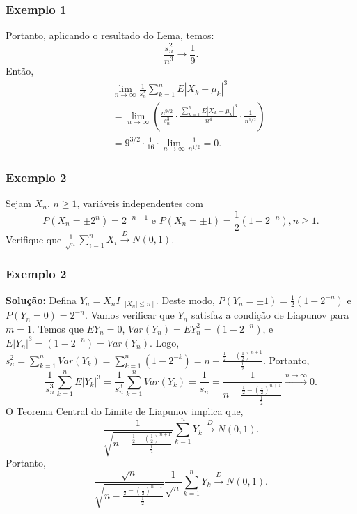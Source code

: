 \begin{frame}
\frametitle{\textbf{Exemplo 1}}
\baselineskip=13pt
\begin{block}{}

Portanto, aplicando o resultado do Lema, temos:
$$\frac{s_n^2}{n^3}\rightarrow \frac{1}{9}.$$
Então,
\begin{eqnarray}
& & \lim_{n\rightarrow\infty}\frac{1}{s_n^3}\sum_{k=1}^{n}E|X_k-\mu_k|^3\nonumber\\
& & =\lim_{n\rightarrow\infty}(\frac{n^{9/2}}{s_n^3}\cdot\frac{\sum_{k=1}^{n}E|X_k-\mu_k|^3}{n^4}\cdot\frac{1}{n^{1/2}})\nonumber\\
& & =9^{3/2}\cdot\frac{1}{16}\cdot\lim_{n\rightarrow\infty}\frac{1}{n^{1/2}}=0.\nonumber
\end{eqnarray}


\end{block}
\end{frame}

\begin{frame}
\frametitle{\textbf{Exemplo 2}}
\baselineskip=13pt
\begin{block}{}

Sejam $X_n$, $n\geq 1$, variáveis independentes com
$$P(X_n=\pm 2^n)=2^{-n-1}\mbox{ e }P(X_n=\pm 1)=\frac{1}{2}(1-2^{-n}),n\geq 1.$$
Verifique que $\frac{1}{\sqrt{n}}\sum_{i=1}^{n}X_i\xrightarrow{D}N(0,1)$.

\end{block}
\end{frame}

\begin{frame}
\frametitle{\textbf{Exemplo 2}}
\baselineskip=13pt
\begin{block}{}


{\bf Solução:} Defina $Y_n=X_nI_{[|X_n|\leq n]}$. Deste modo, $P(Y_n=\pm 1)=\frac{1}{2}(1-2^{-n})$ e $P(Y_n=0)=2^{-n}$. Vamos verificar que $Y_n$ satisfaz a condição de Liapunov para $m=1$. Temos que $EY_n=0$, $Var(Y_n)=EY_n^2=(1-2^{-n})$, e $E|Y_n|^3=(1-2^{-n})=Var(Y_n)$. Logo, $s_n^2=\sum_{k=1}^{n}Var(Y_k)=\sum_{k=1}^{n}(1-2^{-k})=n-\frac{\frac{1}{2}-(\frac{1}{2})^{n+1}}{\frac{1}{2}}$.
Portanto,
$$\frac{1}{s_n^3}\sum_{k=1}^{n}E|Y_k|^3=\frac{1}{s_n^3}\sum_{k=1}^{n}Var(Y_k)=\frac{1}{s_n}=\frac{1}{n-\frac{\frac{1}{2}-(\frac{1}{2})^{n+1}}{\frac{1}{2}}}\xrightarrow{n\rightarrow\infty}0.$$
O Teorema Central do Limite de Liapunov implica que, $$\frac{1}{\sqrt{n-\frac{\frac{1}{2}-(\frac{1}{2})^{n+1}}{\frac{1}{2}}}}\sum_{k=1}^{n}Y_k\xrightarrow{D}N(0,1).$$
Portanto,
$$\frac{\sqrt{n}}{\sqrt{n-\frac{\frac{1}{2}-(\frac{1}{2})^{n+1}}{\frac{1}{2}}}}\frac{1}{\sqrt{n}}\sum_{k=1}^{n}Y_k\xrightarrow{D}N(0,1).$$

\end{block}
\end{frame}

